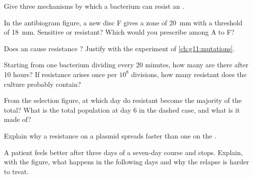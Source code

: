 \begin{exercise}[$\star$]\label{exo:g11:antibiotic-resistance:3}
Give three mechanisms by which a bacterium can resist an .
\end{exercise}

\begin{exercise}[$\star$]\label{exo:g11:antibiotic-resistance:4}
In the antibiogram figure, a new disc F gives a zone of
\qty{20}{mm} with a threshold of \qty{18}{mm}. Sensitive or
resistant? Which  would you prescribe among A to F?
\end{exercise}

\begin{exercise}[$\star$]\label{exo:g11:antibiotic-resistance:5}
Does an  cause resistance ? Justify with the
experiment of \cref{ch:g11:mutations}.
\end{exercise}

\begin{exercise}[$\star\star$]\label{exo:g11:antibiotic-resistance:6}
Starting from one bacterium dividing every 20 minutes, how many are
there after 10 hours? If resistance arises once per $10^8$ divisions,
how many resistant  does the culture probably contain?
\end{exercise}

\begin{exercise}[$\star\star$]\label{exo:g11:antibiotic-resistance:7}
From the selection figure, at which day do resistant  become the
majority of the total? What is the total population at day 6 in the
dashed case, and what is it made of?
\end{exercise}

\begin{exercise}[$\star\star$]\label{exo:g11:antibiotic-resistance:8}
Explain why a resistance  on a plasmid spreads faster than one on
the .
\end{exercise}

\begin{exercise}[$\star\star$]\label{exo:g11:antibiotic-resistance:9}
A patient feels better after three days of a seven-day course and
stops. Explain, with the figure, what happens in the following days
and why the relapse is harder to treat.
\end{exercise}

